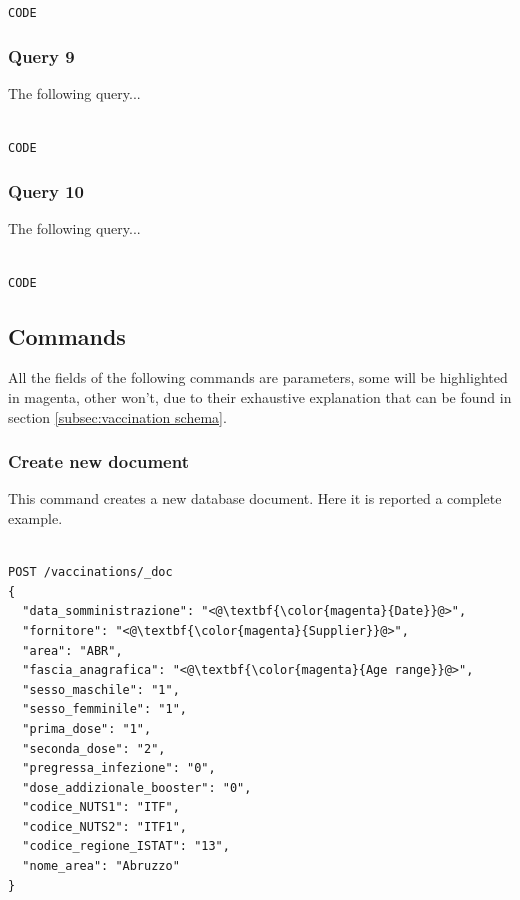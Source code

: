 \documentclass{article}
\begin{document}
\begin{lstlisting}[language=cypher, label=lst:cypher-example]

CODE

\end{lstlisting}
\subsubsection{Query 9}
The following query...

\begin{lstlisting}[language=cypher, label=lst:cypher-example]

CODE

\end{lstlisting}
\subsubsection{Query 10}
The following query...

\begin{lstlisting}[language=cypher, label=lst:cypher-example]

CODE

\end{lstlisting}
\newpage
\subsection{Commands}
All the fields of the following commands are parameters, some will be highlighted in magenta, other won't, due to their exhaustive explanation that can be found in section \ref{subsec:vaccination schema}.
\subsubsection{Create new document}
This command creates a new database document. Here it is reported a complete example. 

\begin{lstlisting}[language=cypher, label=lst:cypher-example]

POST /vaccinations/_doc
{
  "data_somministrazione": "<@\textbf{\color{magenta}{Date}}@>",
  "fornitore": "<@\textbf{\color{magenta}{Supplier}}@>",
  "area": "ABR",
  "fascia_anagrafica": "<@\textbf{\color{magenta}{Age range}}@>",
  "sesso_maschile": "1",
  "sesso_femminile": "1",
  "prima_dose": "1",
  "seconda_dose": "2",
  "pregressa_infezione": "0",
  "dose_addizionale_booster": "0",
  "codice_NUTS1": "ITF",
  "codice_NUTS2": "ITF1",
  "codice_regione_ISTAT": "13",
  "nome_area": "Abruzzo"
}

\end{lstlisting}
\newpage
\end{document}
